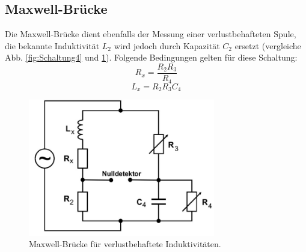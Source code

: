 \subsection{Maxwell-Brücke}
\label{sec:Theorie4}
Die Maxwell-Brücke dient ebenfalls der Messung einer verlustbehafteten Spule, die bekannte Induktivität $L_2$ wird jedoch durch Kapazität $C_2$ ersetzt (vergleiche Abb. \ref{fig:Schaltung4} und \ref{fig:Schaltung5}).
Folgende Bedingungen gelten für diese Schaltung:
\begin{equation}
  R_x = \frac{R_2 R_3}{R_4}
  \label{eqn:gl9}
\end{equation}
\begin{equation}
  L_x = R_2 R_3 C_4
  \label{eqn:gl10}
\end{equation}
\begin{figure}
  \includegraphics[height=6cm]{data/Schaltung5.jpg}
  \centering
  \caption{Maxwell-Brücke für verlustbehaftete Induktivitäten.}
  \label{fig:Schaltung5}
\end{figure}
\FloatBarrier

